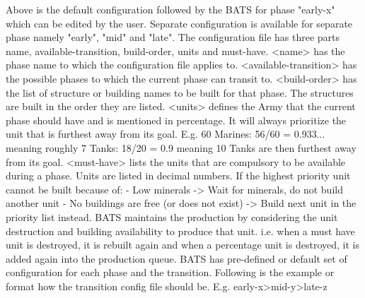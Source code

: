Above is the default configuration followed by the BATS for phase "early-x" which can be edited by the user. Separate configuration is available for separate phase namely "early", "mid" and "late". The configuration file has three parts name, available-transition, build-order, units and must-have. <name> has the phase name to which the configuration file applies to. <available-transition> has the possible phases to which the current phase can transit to. <build-order> has the list of structure or building names to be built for that phase. The structures are built in the order they are listed. <units> defines the Army that the current phase should have and is mentioned in percentage. 
It will always prioritize the unit that is furthest away from its goal.
E.g. 60%
Marines: 56/60 = 0.933... meaning roughly 7%
Tanks: 18/20 = 0.9 meaning 10%
Tanks are then furthest away from its goal.
<must-have> lists the units that are compulsory to be available during a phase. Units are listed in decimal numbers. If the highest priority unit cannot be built because of: 
- Low minerals -> Wait for minerals, do not build another unit
- No buildings are free (or does not exist) -> Build next unit in the priority list instead.
BATS maintains the production by considering the unit destruction and building availability to produce that unit. i.e. when a must have unit is destroyed, it is rebuilt again and when a percentage unit is destroyed, it is added again into the production queue.
BATS has pre-defined or default set of configuration for each phase and the transition. Following is the example or format how the transition config file should be.
E.g. early-x>mid-y>late-z